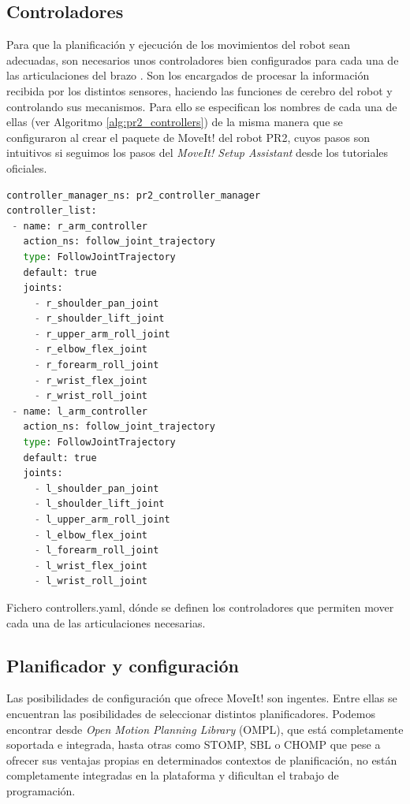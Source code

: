 \documentclass[12pt,spanish,chapterprefix, numbers=noenddot]{book}
\numberwithin{equation}{section}
\numberwithin{figure}{section}
\begin{document}
\subsection{Controladores}
Para que la planificación y ejecución de los movimientos del robot sean adecuadas, son necesarios unos controladores bien configurados para cada una de las articulaciones del brazo \cite{pr2_controllers}. Son los encargados de procesar la información recibida por los distintos sensores, haciendo las funciones de cerebro del robot y controlando sus mecanismos.
Para ello se especifican los nombres de cada una de ellas (ver Algoritmo \ref{alg:pr2_controllers}) de la misma manera que se configuraron al crear el paquete de MoveIt! del robot PR2, cuyos pasos son intuitivos si seguimos los pasos del \textit{MoveIt! Setup Assistant} desde los tutoriales oficiales. \cite{moveit_tutorials}

\begin{algorithm}[htb!]
	\begin{lstlisting}[breaklines=true,language=python] 
controller_manager_ns: pr2_controller_manager
controller_list:
 - name: r_arm_controller
   action_ns: follow_joint_trajectory
   type: FollowJointTrajectory
   default: true
   joints:
     - r_shoulder_pan_joint
     - r_shoulder_lift_joint
     - r_upper_arm_roll_joint
     - r_elbow_flex_joint
     - r_forearm_roll_joint
     - r_wrist_flex_joint
     - r_wrist_roll_joint
 - name: l_arm_controller
   action_ns: follow_joint_trajectory
   type: FollowJointTrajectory
   default: true
   joints:
     - l_shoulder_pan_joint
     - l_shoulder_lift_joint
     - l_upper_arm_roll_joint
     - l_elbow_flex_joint
     - l_forearm_roll_joint
     - l_wrist_flex_joint
     - l_wrist_roll_joint
	\end{lstlisting}
\caption{\label{alg:pr2_controllers}Fichero controllers.yaml, dónde se definen los controladores que permiten mover cada una de las articulaciones necesarias.}
\end{algorithm}

\subsection{Planificador y configuración}
Las posibilidades de configuración que ofrece MoveIt! son ingentes. Entre ellas se encuentran las posibilidades de seleccionar distintos planificadores. Podemos encontrar desde \textit{Open Motion Planning Library} (OMPL), que está completamente soportada e integrada, hasta otras como STOMP, SBL o CHOMP que pese a ofrecer sus ventajas propias en determinados contextos de planificación, no están completamente integradas en la plataforma y dificultan el trabajo de programación. 
\end{document}
